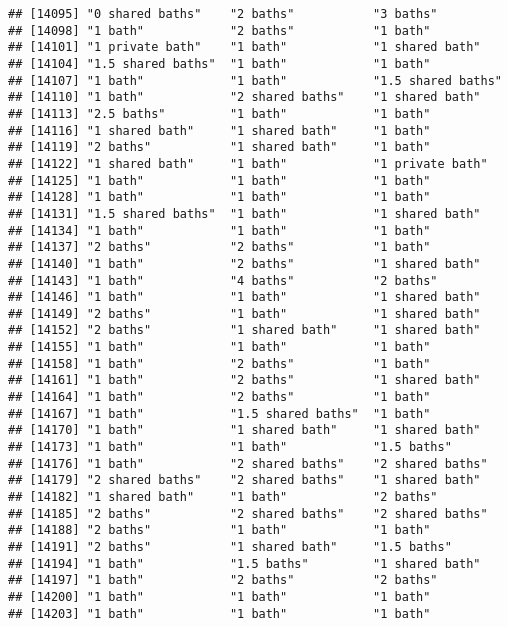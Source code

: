 \documentclass[
]{article}
\begin{document}
\begin{verbatim}
## [14095] "0 shared baths"    "2 baths"           "3 baths"          
## [14098] "1 bath"            "2 baths"           "1 bath"           
## [14101] "1 private bath"    "1 bath"            "1 shared bath"    
## [14104] "1.5 shared baths"  "1 bath"            "1 bath"           
## [14107] "1 bath"            "1 bath"            "1.5 shared baths" 
## [14110] "1 bath"            "2 shared baths"    "1 shared bath"    
## [14113] "2.5 baths"         "1 bath"            "1 bath"           
## [14116] "1 shared bath"     "1 shared bath"     "1 bath"           
## [14119] "2 baths"           "1 shared bath"     "1 bath"           
## [14122] "1 shared bath"     "1 bath"            "1 private bath"   
## [14125] "1 bath"            "1 bath"            "1 bath"           
## [14128] "1 bath"            "1 bath"            "1 bath"           
## [14131] "1.5 shared baths"  "1 bath"            "1 shared bath"    
## [14134] "1 bath"            "1 bath"            "1 bath"           
## [14137] "2 baths"           "2 baths"           "1 bath"           
## [14140] "1 bath"            "2 baths"           "1 shared bath"    
## [14143] "1 bath"            "4 baths"           "2 baths"          
## [14146] "1 bath"            "1 bath"            "1 shared bath"    
## [14149] "2 baths"           "1 bath"            "1 shared bath"    
## [14152] "2 baths"           "1 shared bath"     "1 shared bath"    
## [14155] "1 bath"            "1 bath"            "1 bath"           
## [14158] "1 bath"            "2 baths"           "1 bath"           
## [14161] "1 bath"            "2 baths"           "1 shared bath"    
## [14164] "1 bath"            "2 baths"           "1 bath"           
## [14167] "1 bath"            "1.5 shared baths"  "1 bath"           
## [14170] "1 bath"            "1 shared bath"     "1 shared bath"    
## [14173] "1 bath"            "1 bath"            "1.5 baths"        
## [14176] "1 bath"            "2 shared baths"    "2 shared baths"   
## [14179] "2 shared baths"    "2 shared baths"    "1 shared bath"    
## [14182] "1 shared bath"     "1 bath"            "2 baths"          
## [14185] "2 baths"           "2 shared baths"    "2 shared baths"   
## [14188] "2 baths"           "1 bath"            "1 bath"           
## [14191] "2 baths"           "1 shared bath"     "1.5 baths"        
## [14194] "1 bath"            "1.5 baths"         "1 shared bath"    
## [14197] "1 bath"            "2 baths"           "2 baths"          
## [14200] "1 bath"            "1 bath"            "1 bath"           
## [14203] "1 bath"            "1 bath"            "1 bath"           

\end{verbatim}
\end{document}
